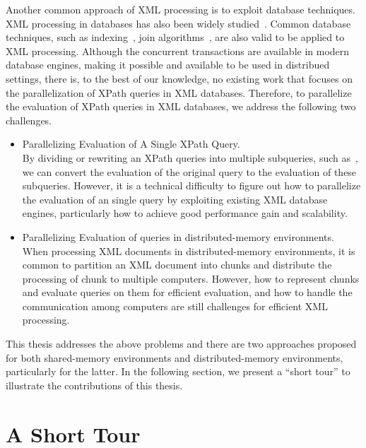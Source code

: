 Another common approach of XML processing is to exploit database techniques. XML
processing in databases has also been widely
studied~\cite{fong2001converting,meier2002exist,jagadish2002timber,jiang2002xparent,PCSS04}.
Common database techniques, such as
indexing~\cite{kha2001xml,wang2005sequencing,popovici2005sirius}, join
algorithms~\cite{liang2005lax,liang2006slax,guha2003index}, are also valid to be
applied to XML processing. Although the concurrent transactions are available in
modern database engines, making it possible and available to be used  in
distribued settings,  there is, to the best of our knowledge, no existing work
that focuses on the parallelization of XPath queries in XML databases.
Therefore, to parallelize the evaluation of XPath queries in XML databases, we
address the following two challenges.

\begin{itemize} \item Parallelizing Evaluation of A Single XPath Query. \\ By
dividing or rewriting an XPath queries into multiple subqueries, such
as~\cite{BoLS09,Bord10},  we can convert the evaluation of the original query to
the evaluation of these subqueries. However, it is a technical difficulty to
figure out how to parallelize the evaluation of an single query by exploiting
existing XML database engines, particularly how to achieve good performance gain
and scalability.

\item Parallelizing Evaluation of queries in distributed-memory environments.\\
When processing XML documents in distributed-memory environments, it is common
to partition an XML document into chunks and distribute the processing of chunk
to multiple computers. However, how to represent chunks and evaluate queries on
them for efficient evaluation, and how to handle the communication among
computers are still challenges for efficient XML processing. \end{itemize}

This thesis addresses the above problems and there are two approaches proposed
for both shared-memory environments and distributed-memory environments,
particularly for the latter. In the following section, we present a ``short
tour'' to illustrate the contributions of this thesis.

\section{A Short Tour}

